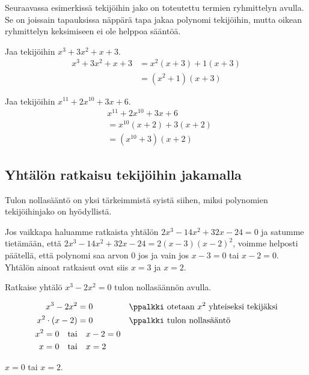 Seuraavassa esimerkissä tekijöihin jako on toteutettu termien ryhmittelyn avulla. Se on joissain tapauksissa näppärä tapa jakaa polynomi tekijöihin, mutta oikean ryhmittelyn keksimiseen ei ole helppoa sääntöä.

\begin{esimerkki}
Jaa tekijöihin $x^3+3x^2+x+3$.
\begin{align*}
x^3+3x^2+x+3 &=x^2(x+3)+1(x+3) \\ &=(x^2+1)(x+3)
\end{align*}
\end{esimerkki}

\begin{esimerkki}
Jaa tekijöihin $x^{11}+2x^{10}+3x+6$.
\begin{align*}
& x^{11}+2x^{10}+3x+6\\
& =x^{10}(x+2)+3(x+2)\\
&=(x^{10}+3)(x+2)
\end{align*}
\end{esimerkki}

\subsection{Yhtälön ratkaisu tekijöihin jakamalla}

Tulon nollasääntö on yksi tärkeimmistä syistä siihen, miksi polynomien tekijöihinjako on hyödyllistä.

Jos vaikkapa haluamme ratkaista yhtälön $2x^3-14x^2+32x-24=0$ ja satumme tietämään, että $2x^3-14x^2+32x-24=2(x-3)(x-2)^2$, voimme helposti päätellä, että polynomi saa arvon $0$ jos ja vain jos $x-3=0$ tai $x-2=0$. Yhtälön ainoat ratkaisut ovat siis $x=3$ ja $x=2$.

\begin{esimerkki}
Ratkaise yhtälö $x^3-2x^2=0$ tulon nollasäännön avulla.
\begin{esimratk}
\begin{align*}
x^3-2x^2 &= 0 && \ppalkki \text{ otetaan } x^2 \text{ yhteiseksi tekijäksi} \\
x^2\cdot(x-2) &= 0 && \ppalkki \text{ tulon nollasääntö} \\
x^2=0 \textrm{\quad tai}& \quad x-2=0 \\
x=0 \textrm{\quad tai}& \quad x=2 \\
\end{align*}
\end{esimratk}
\begin{esimvast}
$x=0$ tai $x=2$.
\end{esimvast}
\end{esimerkki}

